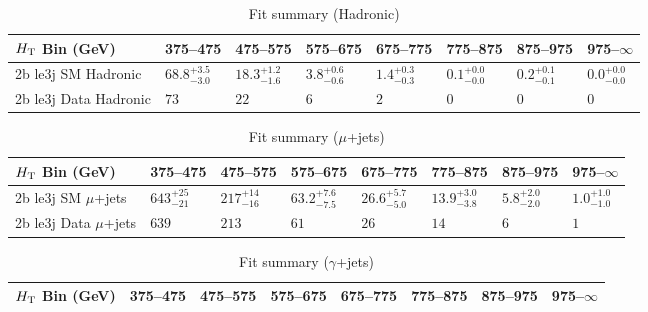 \documentclass[8pt]{article}
\def\scalht{\mbox{$H_{\rm{T}}$}\xspace}
\newcommand\T{\rule{0pt}{2.6ex}}
\begin{document}
\begin{table}[ht!]
\caption{Fit summary (Hadronic)}
\label{tab:ensemble-summary}
\centering
\begin{tabular}{ llllllll }

\hline
\scalht Bin (GeV)       & 375--475                       & 475--575                       & 575--675                       & 675--775                       & 775--875                       & 875--975                       & 975--$\infty$                  \\ [1.000000ex]
\hline
2b le3j SM Hadronic\T   & $68.8^{+3.5}_{-3.0}$           & $18.3^{+1.2}_{-1.6}$           & $3.8^{+0.6}_{-0.6}$            & $1.4^{+0.3}_{-0.3}$            & $0.1^{+0.0}_{-0.0}$            & $0.2^{+0.1}_{-0.1}$            & $0.0^{+0.0}_{-0.0}$            \\ 
2b le3j Data Hadronic\T & $73$                           & $22$                           & $6$                            & $2$                            & $0$                            & $0$                            & $0$                            \\ 
\hline

\end{tabular}
\end{table}
\begin{table}[ht!]
\caption{Fit summary ($\mu$+jets)}
\label{tab:ensemble-summary}
\centering
\begin{tabular}{ llllllll }

\hline
\scalht Bin (GeV)       & 375--475                       & 475--575                       & 575--675                       & 675--775                       & 775--875                       & 875--975                       & 975--$\infty$                  \\ [1.000000ex]
\hline
2b le3j SM $\mu$+jets\T & $643^{+25}_{-21}$              & $217^{+14}_{-16}$              & $63.2^{+7.6}_{-7.5}$           & $26.6^{+5.7}_{-5.0}$           & $13.9^{+3.0}_{-3.8}$           & $5.8^{+2.0}_{-2.0}$            & $1.0^{+1.0}_{-1.0}$            \\ 
2b le3j Data $\mu$+jets\T & $639$                          & $213$                          & $61$                           & $26$                           & $14$                           & $6$                            & $1$                            \\ 
\hline

\end{tabular}
\end{table}
\begin{table}[ht!]
\caption{Fit summary ($\gamma$+jets)}
\label{tab:ensemble-summary}
\centering
\begin{tabular}{ llllllll }

\hline
\scalht Bin (GeV)       & 375--475                       & 475--575                       & 575--675                       & 675--775                       & 775--875                       & 875--975                       & 975--$\infty$                  \\ [1.000000ex]
\hline

\end{tabular}
\end{table}
\end{document}
